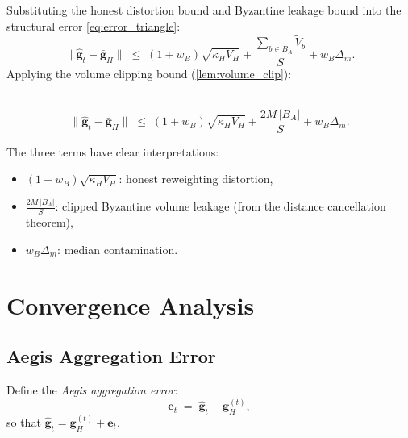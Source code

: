 \documentclass[../main]{subfiles}
\begin{document}
Substituting the honest distortion bound and Byzantine leakage bound
into the structural error \eqref{eq:error_triangle}:
\begin{equation}
    \|\hat{\mathbf{g}}_t - \bar{\mathbf{g}}_H\|
    \;\leq\; (1 + w_B)\sqrt{\kappa_H V_H}
    + \frac{\sum_{b \in B_A}\widetilde{V}_b}{S}
    + w_B \Delta_m.
    \label{eq:robustness_cert}
\end{equation}
Applying the volume clipping bound (\cref{lem:volume_clip}):

\begin{theorem}
\hfill \\\label{thm:agg_error}
\begin{equation}
    \boxed{\|\hat{\mathbf{g}}_t - \bar{\mathbf{g}}_H\|
    \;\leq\; (1 + w_B)\sqrt{\kappa_H V_H}
    + \frac{2M\,|B_A|}{S}
    + w_B \Delta_m.}
    \label{eq:agg_error_bound}
\end{equation}
\end{theorem}

The three terms have clear interpretations:
\begin{itemize}
    \item $(1 + w_B)\sqrt{\kappa_H V_H}$: honest reweighting distortion,
    \item $\frac{2M\,|B_A|}{S}$: clipped Byzantine volume leakage (from the distance cancellation theorem),
    \item $w_B \Delta_m$: median contamination.
\end{itemize}

\section{Convergence Analysis}
\label{app:convergence}

\subsection{Aegis Aggregation Error}

Define the \emph{Aegis aggregation error}:
\begin{equation}
    \mathbf{e}_t \;=\; \hat{\mathbf{g}}_t - \bar{\mathbf{g}}_H^{(t)},
    \label{eq:aegis_error}
\end{equation}
so that $\hat{\mathbf{g}}_t = \bar{\mathbf{g}}_H^{(t)} + \mathbf{e}_t$.
\end{document}
